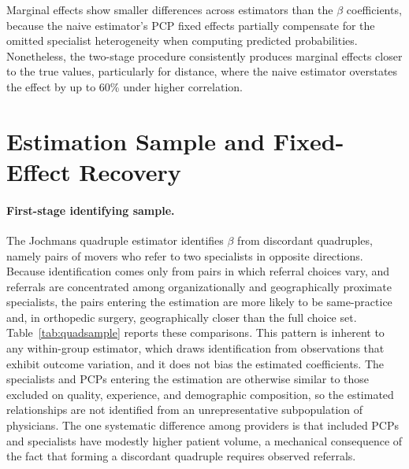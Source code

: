 \documentclass[12pt]{article}
\begin{document}
Marginal effects show smaller differences across estimators than the $\beta$ coefficients, because the naive estimator's PCP fixed effects partially compensate for the omitted specialist heterogeneity when computing predicted probabilities. Nonetheless, the two-stage procedure consistently produces marginal effects closer to the true values, particularly for distance, where the naive estimator overstates the effect by up to 60\% under higher correlation.


\section{Estimation Sample and Fixed-Effect Recovery}
\label{sec:convergence}

\paragraph{First-stage identifying sample.} The Jochmans quadruple estimator identifies $\beta$ from discordant quadruples, namely pairs of movers who refer to two specialists in opposite directions. Because identification comes only from pairs in which referral choices vary, and referrals are concentrated among organizationally and geographically proximate specialists, the pairs entering the estimation are more likely to be same-practice and, in orthopedic surgery, geographically closer than the full choice set. Table~\ref{tab:quadsample} reports these comparisons. This pattern is inherent to any within-group estimator, which draws identification from observations that exhibit outcome variation, and it does not bias the estimated coefficients. The specialists and PCPs entering the estimation are otherwise similar to those excluded on quality, experience, and demographic composition, so the estimated relationships are not identified from an unrepresentative subpopulation of physicians. The one systematic difference among providers is that included PCPs and specialists have modestly higher patient volume, a mechanical consequence of the fact that forming a discordant quadruple requires observed referrals.
\end{document}
